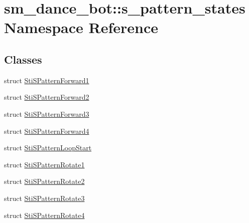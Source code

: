 \hypertarget{namespacesm__dance__bot_1_1s__pattern__states}{}\section{sm\+\_\+dance\+\_\+bot\+:\+:s\+\_\+pattern\+\_\+states Namespace Reference}
\label{namespacesm__dance__bot_1_1s__pattern__states}
\subsection*{Classes}
\begin{DoxyCompactItemize}
\item 
struct \hyperlink{structsm__dance__bot_1_1s__pattern__states_1_1StiSPatternForward1}{Sti\+S\+Pattern\+Forward1}
\item 
struct \hyperlink{structsm__dance__bot_1_1s__pattern__states_1_1StiSPatternForward2}{Sti\+S\+Pattern\+Forward2}
\item 
struct \hyperlink{structsm__dance__bot_1_1s__pattern__states_1_1StiSPatternForward3}{Sti\+S\+Pattern\+Forward3}
\item 
struct \hyperlink{structsm__dance__bot_1_1s__pattern__states_1_1StiSPatternForward4}{Sti\+S\+Pattern\+Forward4}
\item 
struct \hyperlink{structsm__dance__bot_1_1s__pattern__states_1_1StiSPatternLoopStart}{Sti\+S\+Pattern\+Loop\+Start}
\item 
struct \hyperlink{structsm__dance__bot_1_1s__pattern__states_1_1StiSPatternRotate1}{Sti\+S\+Pattern\+Rotate1}
\item 
struct \hyperlink{structsm__dance__bot_1_1s__pattern__states_1_1StiSPatternRotate2}{Sti\+S\+Pattern\+Rotate2}
\item 
struct \hyperlink{structsm__dance__bot_1_1s__pattern__states_1_1StiSPatternRotate3}{Sti\+S\+Pattern\+Rotate3}
\item 
struct \hyperlink{structsm__dance__bot_1_1s__pattern__states_1_1StiSPatternRotate4}{Sti\+S\+Pattern\+Rotate4}
\end{DoxyCompactItemize}
